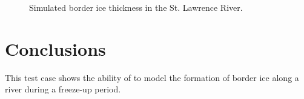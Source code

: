 \begin{figure}[H]
    \begin{center}
    \end{center}
    \caption{Simulated border ice thickness in the St. Lawrence River.}
    \label{fig:simulated_border_ice_cover}
\end{figure}


\section{Conclusions}
This test case shows the ability of \khione to model the formation of border ice along a river during a freeze-up period.

\renewcommand{\labelitemi}{\textbullet}
